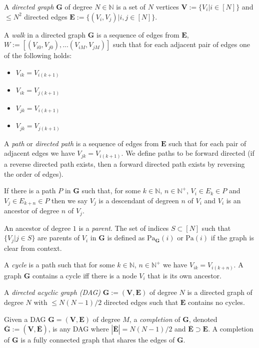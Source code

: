 \begin{definition}
A \emph{directed graph} $\mathbf{G}$ of degree $N\in \mathbb{N}$ is a set of $N$ vertices $\mathbf{V}:=\{V_i|i\in [N]\}$ and $\leq N^2$ directed edges $\mathbf{E}:=\{(V_i,V_j)|i,j\in [N]\}$. 

A \emph{walk} in a directed graph $\mathbf{G}$ is a sequence of edges from $\mathbf{E}$, $W:=[(V_{i0},V_{j0}),...(V_{iM},V_{jM})]$ such that for each adjacent pair of edges one of the following holds:
\begin{itemize}
    \item $V_{ik}=V_{i(k+1)}$
    \item $V_{ik}=V_{j(k+1)}$
    \item $V_{jk}=V_{i(k+1)}$
    \item $V_{jk}=V_{j(k+1)}$
\end{itemize}

A \emph{path} or \emph{directed path} is a sequence of edges from $\mathbf{E}$ such that for each pair of adjacent edges we have $V_{jk}=V_{i(k+1)}$. We define paths to be forward directed (if a reverse directed path exists, then a forward directed path exists by reversing the order of edges).

If there is a path $P$ in $\mathbf{G}$ such that, for some $k\in\mathbb{N}$, $n\in \mathbb{N}^+$, $V_{i}\in E_k\in P$ and $V_j\in E_{k+n}\in P$ then we say $V_j$ is a descendant of degreen $n$ of $V_i$ and $V_i$ is an ancestor of degree $n$ of $V_j$. 

An ancestor of degree $1$ is a \emph{parent}. The set of indices $S\subset[N]$ such that $\{V_j|j\in S\}$ are parents of $V_i$ in $\mathbf{G}$ is defined as $\mathrm{Pa}_{\mathbf{G}}(i)$ or $\mathrm{Pa}(i)$ if the graph is clear from context.

A \emph{cycle} is a path such that for some $k\in \mathbb{N}$, $n\in \mathbb{N}^+$ we have $V_{ik}=V_{i(k+n)}$. A graph $\mathbf{G}$ contains a cycle iff there is a node $V_i$ that is its own ancestor.

A \emph{directed acyclic graph (DAG)} $\mathbf{G}:=(\mathbf{V},\mathbf{E})$ of degree $N$ is a directed graph of degree $N$ with $\leq N(N-1)/2$ directed edges such that $\mathbf{E}$ contains no cycles.
\end{definition}

\begin{definition}[Completion]
Given a DAG $\mathbf{G}=(\mathbf{V},\mathbf{E})$ of degree $M$, a \emph{completion} of $\mathbf{G}$, denoted $\overline{\mathbf{G}}:=(\mathbf{V},\overline{\mathbf{E}})$, is any DAG where $|\overline{\mathbf{E}}|=N(N-1)/2$ and $\overline{\mathbf{E}}\supset\mathbf{E}$. A completion of $\mathbf{G}$ is a fully connected graph that shares the edges of $\mathbf{G}$.
\end{definition}

